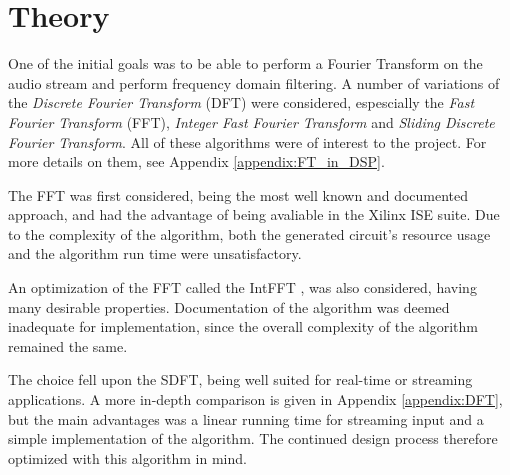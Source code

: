 \section{Theory}

One of the initial goals was to be able to perform a Fourier Transform on the
audio stream and perform frequency domain filtering. A number of variations of
the \textit{Discrete Fourier Transform} (DFT) were considered, espescially the \textit{Fast Fourier Transform} (FFT), \textit{Integer Fast
Fourier Transform} and \textit{Sliding Discrete Fourier Transform}. All of these algorithms were of
interest to the project. For more details on them, see Appendix \ref{appendix:FT_in_DSP}.

The FFT was first considered, being the most well known and documented approach,
and had the advantage of being avaliable in the Xilinx ISE suite. Due to the
complexity of the algorithm, both the generated circuit's resource usage and the
algorithm run time were unsatisfactory.

An optimization of the FFT called the IntFFT \cite{oraintara}, was also
considered, having many desirable properties. Documentation of the algorithm was
deemed inadequate for implementation, since the overall complexity of the
algorithm remained the same.

The choice fell upon the SDFT\cite{jacobsen03}, being well suited for real-time
or streaming applications. A more in-depth comparison is given in Appendix
\ref{appendix:DFT}, but the main advantages was a linear running time for
streaming input and a simple implementation of the algorithm. The continued
design process therefore optimized with this algorithm in mind.
